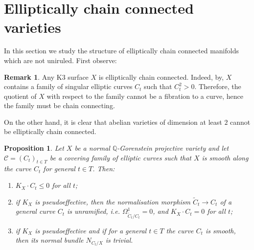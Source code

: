 \documentclass[11pt]{article}
\newtheorem{prop}[theo]{Proposition}
\theoremstyle{definition}
\newtheorem{rema}[theo]{Remark}
\numberwithin{equation}{section}
\numberwithin{figure}{section}
\numberwithin{table}{section}
\newcommand{\Qbb}{\mathbb{Q}} %
\newcommand\sC{\mathcal{C}}
\newcommand*{\romanenumi}{\renewcommand*{\theenumi}{\roman{enumi}}}
\begin{document}
\section{Elliptically chain connected varieties}\label{sec:ellchainconn}

In this section we study the structure of elliptically chain connected manifolds which are not uniruled. First observe:

\begin{rema}\label{rema:main5.1}
Any K3 surface $X$ is elliptically chain connected. Indeed, by\linebreak\cite[Corollary~13.2.2]{Huy16}, $X$ contains a family of singular elliptic curves $C_t$ such that $C_t^2 > 0$. Therefore, the quotient of $X$ with respect to the family cannot be a fibration to a curve, hence the family must be chain connecting.
\end{rema}

On the other hand, it is clear that abelian varieties of dimension at least $2$ cannot be elliptically chain connected.

\begin{prop}\label{prop:etale}
Let $X$ be a normal $\Qbb$-Gorenstein projective variety and let $\sC = (C_t)_{t\in T} $ be a covering family of elliptic curves such that $X$ is smooth along the curve $C_t$ for general $t\in T$. Then:
\begin{enumerate}\romanenumi
\item \label{list-5.2.1}$K_X \cdot C_t \leq 0$ for all $t$;
\item \label{list-5.2.2}if $K_X$ is pseudoeffective, then the normalisation morphism $\widetilde C_t \to C_t$ of a general curve $C_t$ is unramified, i.e.
$\Omega^1_{\widetilde C_t/C_t} = 0$, and $K_X \cdot C_t = 0$ for all $t$;
\item \label{list-5.2.3}if $K_X$ is pseudoeffective and if for a general $t\in T$ the curve $C_t$ is smooth, then its normal bundle $N_{C_t/X}$ is trivial.
\end{enumerate}
\end{prop}
\end{document}
